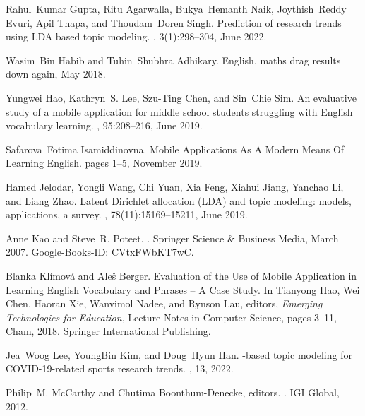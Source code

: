 \begin{thebibliography}{10}
Rahul~Kumar Gupta, Ritu Agarwalla, Bukya~Hemanth Naik, Joythish~Reddy Evuri,
  Apil Thapa, and Thoudam~Doren Singh.
\newblock Prediction of research trends using {LDA} based topic modeling.
, 3(1):298--304, June 2022.

Wasim~Bin Habib and Tuhin~Shubhra Adhikary.
\newblock English, maths drag results down again, May 2018.

Yungwei Hao, Kathryn~S. Lee, Szu-Ting Chen, and Sin~Chie Sim.
\newblock An evaluative study of a mobile application for middle school
  students struggling with {English} vocabulary learning.
, 95:208--216, June 2019.

Safarova~Fotima Isamiddinovna.
\newblock Mobile {Applications} {As} {A} {Modern} {Means} {Of} {Learning}
  {English}.
\newblock pages 1--5, November 2019.

Hamed Jelodar, Yongli Wang, Chi Yuan, Xia Feng, Xiahui Jiang, Yanchao Li, and
  Liang Zhao.
\newblock Latent {Dirichlet} allocation ({LDA}) and topic modeling: models,
  applications, a survey.
, 78(11):15169--15211, June
  2019.

Anne Kao and Steve~R. Poteet.
.
\newblock Springer Science \& Business Media, March 2007.
\newblock Google-Books-ID: CVtxFWbKT7wC.

Blanka Klímová and Aleš Berger.
\newblock Evaluation of the {Use} of {Mobile} {Application} in {Learning}
  {English} {Vocabulary} and {Phrases} – {A} {Case} {Study}.
\newblock In Tianyong Hao, Wei Chen, Haoran Xie, Wanvimol Nadee, and Rynson
  Lau, editors, {\em Emerging {Technologies} for {Education}}, Lecture {Notes}
  in {Computer} {Science}, pages 3--11, Cham, 2018. Springer International
  Publishing.

Jea~Woog Lee, YoungBin Kim, and Doug~Hyun Han.
-based topic modeling for {COVID}-19-related sports research
  trends.
, 13, 2022.

Philip~M. McCarthy and Chutima Boonthum-Denecke, editors.
.
\newblock IGI Global, 2012.


\end{thebibliography}

